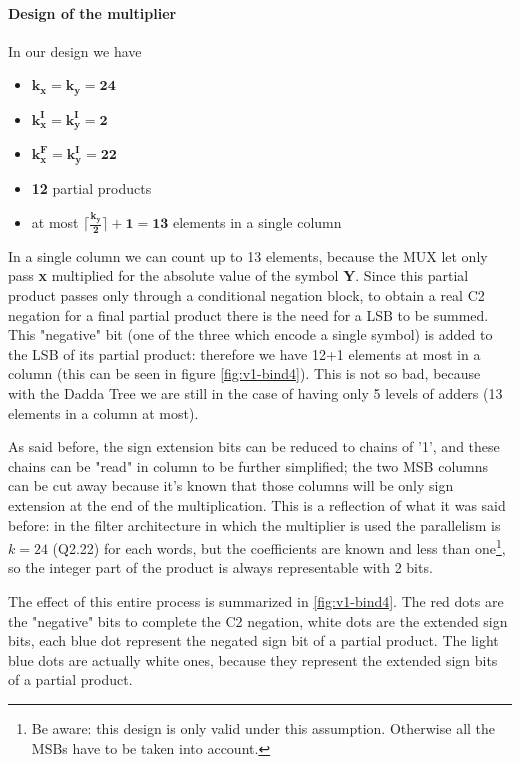 \documentclass[a4paper]{article}
\begin{document}
	\paragraph{Design of the multiplier} In our design we have
		\begin{itemize}
			\item $\bm{k_x = k_y = 24}$
			\item $\bm{k_x^{I} = k_y^{I} = 2}$
			\item $\bm{k_x^{F} = k_y^{I} = 22}$
			\item \textbf{12} partial products
			\item at most $\bm{\lceil \frac{k_y}{2} \rceil +1 = 13}$ elements in a single column
		\end{itemize}

	In a single column we can count up to 13 elements, because the MUX let only pass \textbf{x} multiplied for the absolute value of the symbol \textbf{Y}. Since this partial product passes only through a conditional negation block, to obtain a real C2 negation for a final partial product there is the need for a LSB to be summed. This "negative" bit (one of the three which encode a single symbol) is added
	to the LSB of its partial product: therefore we have 12+1 elements at most in a column (this can be seen in figure \ref{fig:v1-bind4}).
	This is not so bad, because with the Dadda Tree we are still in the case of having only 5 levels of adders (13 elements in a column at most).

	As said before, the sign extension bits can be reduced to chains of '1', and these chains can be "read" in column to be further simplified; the two MSB columns can be cut away because it's known that those columns will be only sign extension at the end of the multiplication. This is a reflection of what it was said before: in the filter architecture in which the multiplier is used the parallelism is $k = 24$ (Q2.22) for each words, but the coefficients are known and less than one\footnote{Be aware: this design is only valid under this assumption. Otherwise all the MSBs have to be taken into account.}, so the integer part of the product is always representable with 2 bits.

	The effect of this entire process is summarized in \ref{fig:v1-bind4}. The red dots are the "negative" bits to complete the C2 negation, white dots are the extended sign bits, each blue dot represent the negated sign bit of a partial product. The light blue dots are actually white ones, because they represent the extended sign bits of a partial product.
\end{document}
